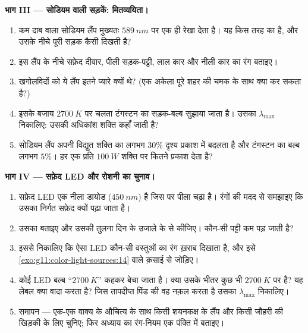 \begin{problem}
\medskip
\noindent\textbf{भाग III --- सोडियम वाली सड़कें:  मितव्ययिता।}
\begin{enumerate}[resume]
  \item कम दाब वाला सोडियम लैंप मुख्यतः $\qty{589}{nm}$ पर एक ही रेखा
        देता है। यह किस तरह का  है, और उसके नीचे पूरी
        सड़क कैसी दिखती है?
  \item इस लैंप के नीचे सफ़ेद दीवार, पीली सड़क-पट्टी, लाल कार और नीली
        कार का  रंग बताइए।
  \item खगोलविदों को ये लैंप इतने प्यारे क्यों थे? (एक अकेला
         पूरे शहर की चमक के साथ क्या कर सकता है?)
  \item इसके बजाय $\qty{2700}{K}$ पर चलता टंगस्टन का सड़क-बल्ब सुझाया जाता है।
        उसका $\lambda_{\max}$ निकालिए: उसकी अधिकांश शक्ति कहाँ जाती है?
  \item सोडियम लैंप अपनी विद्युत शक्ति का लगभग $30\%$ दृश्य
        प्रकाश में बदलता है और टंगस्टन का बल्ब लगभग $5\%$। हर एक
        प्रति $\qty{100}{W}$ शक्ति पर कितने  प्रकाश देता
        है?
\end{enumerate}

\medskip
\noindent\textbf{भाग IV --- सफ़ेद LED और रोशनी का चुनाव।}
\begin{enumerate}[resume]
  \item सफ़ेद LED एक नीला डायोड ($\qty{450}{nm}$) है जिस पर पीला
         चढ़ा है।  रंगों की मदद से
        समझाइए कि उसका निर्गत सफ़ेद क्यों पढ़ा जाता है।
  \item उसका  बताइए और उसकी तुलना दिन के उजाले के
         से कीजिए। कौन-सी पट्टी कम पड़ जाती है?
  \item इससे निकालिए कि ऐसा LED कौन-सी वस्तुओं का रंग ख़राब दिखाता है,
        और इसे \cref{exo:g11:color-light-sources:14} वाले क़साई से जोड़िए।
  \item कोई LED बल्ब ``$\qty{2700}{K}$'' कहकर बेचा जाता है। क्या उसके भीतर कुछ
        भी $\qty{2700}{K}$ पर है? यह लेबल क्या वादा करता है? जिस तापदीप्त पिंड
        की वह नक़ल करता है उसका $\lambda_{\max}$ निकालिए।
  \item समापन --- एक-एक वाक्य के औचित्य के साथ किसी शयनकक्ष के लैंप और
        किसी जौहरी की खिड़की के लिए  चुनिए; फिर अध्याय
        का रंग-नियम एक पंक्ति में बताइए।
\end{enumerate}
\end{problem}

